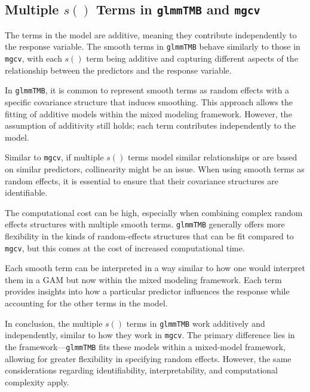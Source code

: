 \subsection{Multiple \( s() \) Terms in \texttt{glmmTMB} and \texttt{mgcv}}

The terms in the model are additive, meaning they contribute independently to the response variable. The smooth terms in \texttt{glmmTMB} behave similarly to those in \texttt{mgcv}, with each \( s() \) term being additive and capturing different aspects of the relationship between the predictors and the response variable.


In \texttt{glmmTMB}, it is common to represent smooth terms as random effects with a specific covariance structure that induces smoothing. This approach allows the fitting of additive models within the mixed modeling framework. However, the assumption of additivity still holds; each term contributes independently to the model.


Similar to \texttt{mgcv}, if multiple \( s() \) terms model similar relationships or are based on similar predictors, collinearity might be an issue. When using smooth terms as random effects, it is essential to ensure that their covariance structures are identifiable.


The computational cost can be high, especially when combining complex random effects structures with multiple smooth terms. \texttt{glmmTMB} generally offers more flexibility in the kinds of random-effects structures that can be fit compared to \texttt{mgcv}, but this comes at the cost of increased computational time.


Each smooth term can be interpreted in a way similar to how one would interpret them in a GAM but now within the mixed modeling framework. Each term provides insights into how a particular predictor influences the response while accounting for the other terms in the model.


In conclusion, the multiple \( s() \) terms in \texttt{glmmTMB} work additively and independently, similar to how they work in \texttt{mgcv}. The primary difference lies in the framework—\texttt{glmmTMB} fits these models within a mixed-model framework, allowing for greater flexibility in specifying random effects. However, the same considerations regarding identifiability, interpretability, and computational complexity apply.
